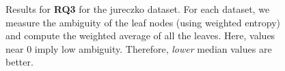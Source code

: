 \def\checkmark{\tikz\fill[scale=0.3](0,.35) -- (.25,0) -- (1,.7) -- (.25,.15) -- cycle;}
\begin{figure}[tbp!]
\centering
{}

\caption{Results for \textbf{RQ3} for the jureczko dataset. For each 
dataset, we measure the ambiguity of the leaf nodes (using weighted entropy) and compute the weighted average of all the leaves. Here, values near 0 imply low ambiguity. Therefore, \textit{lower} median values are better.}
\label{fig:rq3}
\end{figure}